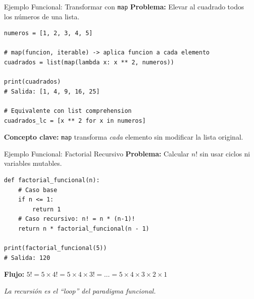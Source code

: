 \documentclass[aspectratio=169]{beamer}
\begin{document}
\begin{frame}[fragile]{Ejemplo Funcional: Transformar con \texttt{map}}
    \textbf{Problema:} Elevar al cuadrado todos los números de una lista.
    \vspace{0.3cm}
    
    \begin{lstlisting}[title=Enfoque Funcional con map]
numeros = [1, 2, 3, 4, 5]

# map(funcion, iterable) -> aplica funcion a cada elemento
cuadrados = list(map(lambda x: x ** 2, numeros))

print(cuadrados)
# Salida: [1, 4, 9, 16, 25]

# Equivalente con list comprehension
cuadrados_lc = [x ** 2 for x in numeros]
    \end{lstlisting}
    
    \vspace{0.3cm}
    \textbf{Concepto clave:} \texttt{map} transforma \textit{cada} elemento sin modificar la lista original.
\end{frame}

\begin{frame}[fragile]{Ejemplo Funcional: Factorial Recursivo}
    \textbf{Problema:} Calcular $n!$ sin usar ciclos ni variables mutables.
    \vspace{0.3cm}
    
    \begin{lstlisting}[title=Factorial Funcional (Recursivo)]
def factorial_funcional(n):
    # Caso base
    if n <= 1:
        return 1
    # Caso recursivo: n! = n * (n-1)!
    return n * factorial_funcional(n - 1)

print(factorial_funcional(5))
# Salida: 120
    \end{lstlisting}
    
    \vspace{0.3cm}
    \textbf{Flujo:} $5! = 5 \times 4! = 5 \times 4 \times 3! = \ldots = 5 \times 4 \times 3 \times 2 \times 1$
    
    \vspace{0.2cm}
    \small\textit{La recursión es el ``loop'' del paradigma funcional.}
\end{frame}
\end{document}
